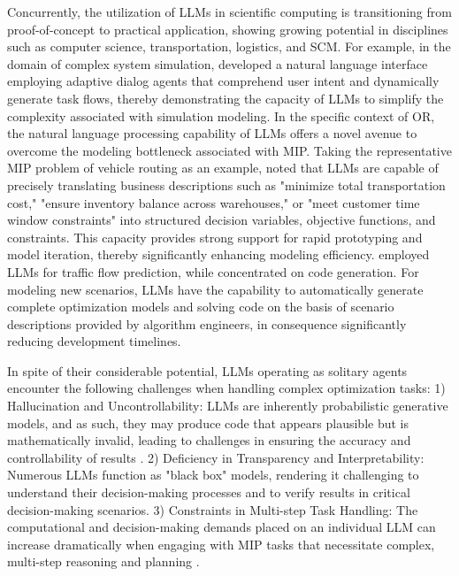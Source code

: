 \documentclass[preprint,12pt]{elsarticle}
\begin{document}
Concurrently, the utilization of LLMs in scientific computing is transitioning from proof-of-concept to practical application, showing growing potential in disciplines such as computer science, transportation, logistics, and SCM. For example, in the domain of complex system simulation, \citet{liAdaptiveTODLLMdrivenAdaptive2025a} developed a natural language interface employing adaptive dialog agents that comprehend user intent and dynamically generate task flows, thereby demonstrating the capacity of LLMs to simplify the complexity associated with simulation modeling. In the specific context of OR, the natural language processing capability of LLMs offers a novel avenue to overcome the modeling bottleneck associated with MIP. Taking the representative MIP problem of vehicle routing as an example, \citet{jiangDROCELEVATINGLARGE2025a} noted that LLMs are capable of precisely translating business descriptions such as "minimize total transportation cost," "ensure inventory balance across warehouses," or "meet customer time window constraints" into structured decision variables, objective functions, and constraints. This capacity provides strong support for rapid prototyping and model iteration, thereby significantly enhancing modeling efficiency. \citet{liuSTLLMGraphEnhanced2025} employed LLMs for traffic flow prediction, while \citet{ishibashiSelfOrganizedAgentsLLM2024} concentrated on code generation. For modeling new scenarios, LLMs have the capability to  automatically generate complete optimization models and solving code on the basis of  scenario descriptions provided by algorithm engineers, in consequence significantly reducing development timelines.

In spite of their considerable potential, LLMs operating as solitary agents encounter the following challenges when handling complex optimization tasks:
1) Hallucination and Uncontrollability: LLMs are inherently probabilistic generative models, and as such, they may produce code that appears plausible but is mathematically invalid, leading to challenges in ensuring the accuracy and controllability of results \citep{huangSurveyHallucinationLarge2025}.
2) Deficiency in Transparency and Interpretability: Numerous LLMs function as "black box" models, rendering it challenging to understand their decision-making processes and to verify results in critical decision-making scenarios.
3) Constraints in Multi-step Task Handling: The computational and decision-making demands placed on an individual LLM can increase dramatically when engaging with MIP tasks that necessitate complex, multi-step reasoning and planning \citep{labanLLMsGetLost2025a}.
\end{document}
